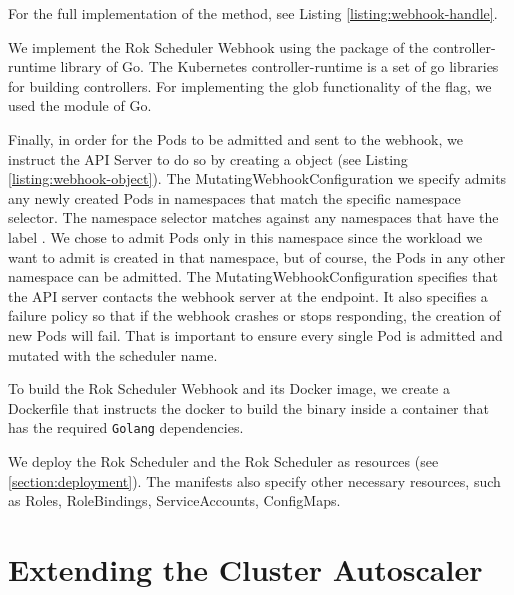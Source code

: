 For the full implementation of the method, see Listing
\ref{listing:webhook-handle}.

We implement the Rok Scheduler Webhook using the  package of the
controller-runtime library of Go. The Kubernetes controller-runtime is a set of
go libraries for building controllers. For implementing the glob functionality
of the  flag, we used the  module of Go. 

Finally, in order for the Pods to be admitted and sent to the webhook, we
instruct the API Server to do so by creating a 
object (see Listing \ref{listing:webhook-object}). The
MutatingWebhookConfiguration we specify admits any newly created Pods in
namespaces that match the specific namespace selector. The namespace selector
matches against any namespaces that have the label .
We chose to admit Pods only in this namespace since the workload we want to
admit is created in that namespace, but of course, the Pods in any other
namespace can be admitted. The MutatingWebhookConfiguration specifies that the
API server contacts the webhook server at the  endpoint. It also
specifies a  failure policy so that if the webhook crashes or stops
responding, the creation of new Pods will fail. That is important to ensure
every single Pod is admitted and mutated with the scheduler name.





To build the Rok Scheduler Webhook and its Docker image, we create a Dockerfile
that instructs the docker to build the binary inside a container that has the
required \texttt{Golang} dependencies. 

We deploy the Rok Scheduler and the Rok Scheduler as  resources
(see \ref{section:deployment}). The manifests also specify other necessary
resources, such as Roles, RoleBindings, ServiceAccounts, ConfigMaps.

\section{Extending the Cluster Autoscaler}


